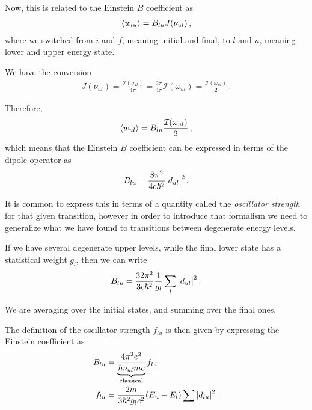 \documentclass[main.tex]{subfiles}
\begin{document}
Now, this is related to the Einstein \(B\) coefficient as 
%
\begin{align}
\expval{w_{lu}} = B_{lu} J(\nu _{ul})
\,,
\end{align}
%
where we switched from \(i\) and \(f\), meaning initial and final, to \(l\) and \(u\), meaning lower and upper energy state. 

We have the conversion 
%
\begin{align}
J(\nu _{ul}) = \frac{\mathcal{I}(\nu _{ul})}{4 \pi }
= \frac{2 \pi }{4 \pi } \mathcal{I}(\omega _{ul})
= \frac{\mathcal{I}(\omega _{ul})}{2}
\,.
\end{align}


Therefore, 
%
\begin{align}
\expval{w_{ul}} = B_{lu} \frac{\mathcal{I}(\omega _{ul})}{2}
\,,
\end{align}
%
which means that the Einstein \(B\) coefficient can be expressed in terms of the dipole operator as 
%
\begin{align}
B_{lu} = \frac{8 \pi^2}{4 c \hbar^2} \abs{d_{ul}}^2
\,.
\end{align}

It is common to express this in terms of a quantity called the \emph{oscillator strength} for that given transition, however in order to introduce that formalism we need to generalize what we have found to transitions between degenerate energy levels. 

If we have several degenerate upper levels, while the final lower state has a statistical weight \(g_l\), then we can write 
%
\begin{align}
B_{lu} = \frac{32 \pi^2}{3 c \hbar^2} \frac{1}{g_l} \sum _{l} \abs{d_{ul}}^2
\,.
\end{align}

We are averaging over the initial states, and summing over the final ones.



The definition of the oscillator strength \(f_{lu}\) is then given by expressing the Einstein coefficient as 
%
\begin{align}
B_{lu} &= \underbrace{\frac{4 \pi^2 e^2}{h \nu_{ul} m c}}_{\text{classical}} f_{lu}  \\
f_{lu} &= \frac{2 m }{3 \hbar^2 g_l c^2} (E_u - E_l) \sum \abs{d_{lu}}^2  
\,.
\end{align}
\end{document}
